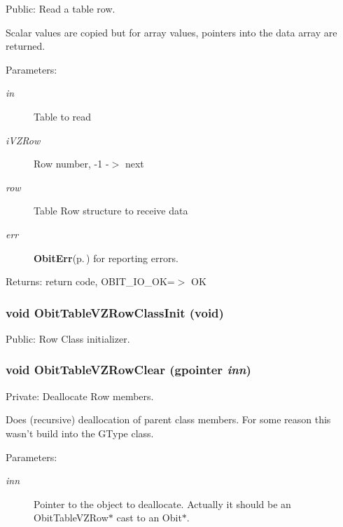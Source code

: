Public: Read a table row. 

Scalar values are copied but for array values, pointers into the data array are returned. \begin{Desc}
\item[Parameters:]
\begin{description}
\item[{\em in}]Table to read \item[{\em i\-VZRow}]Row number, -1 -$>$ next \item[{\em row}]Table Row structure to receive data \item[{\em err}]{\bf Obit\-Err}{\rm (p.\,\pageref{structObitErr})} for reporting errors. \end{description}
\end{Desc}
\begin{Desc}
\item[Returns:]return code, OBIT\_\-IO\_\-OK=$>$ OK \end{Desc}
\subsubsection{\setlength{\rightskip}{0pt plus 5cm}void Obit\-Table\-VZRow\-Class\-Init (void)}\label{ObitTableVZ_8c_a26}


Public: Row Class initializer. 

\subsubsection{\setlength{\rightskip}{0pt plus 5cm}void Obit\-Table\-VZRow\-Clear (gpointer {\em inn})}\label{ObitTableVZ_8c_a7}


Private: Deallocate Row members. 

Does (recursive) deallocation of parent class members. For some reason this wasn't build into the GType class. \begin{Desc}
\item[Parameters:]
\begin{description}
\item[{\em inn}]Pointer to the object to deallocate. Actually it should be an Obit\-Table\-VZRow$\ast$ cast to an Obit$\ast$. \end{description}
\end{Desc}
